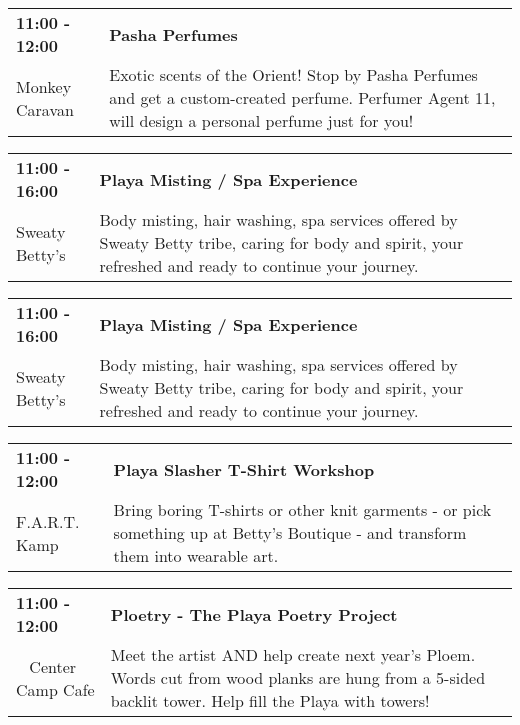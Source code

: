 \begin{tabular}{ p{1in} p{2.2in} }
    \textbf{11:00 - 12:00} & \textbf{Pasha Perfumes} \\
    Monkey Caravan \newline  & Exotic scents of the Orient! Stop by Pasha Perfumes and get a custom-created perfume.  Perfumer Agent 11, will design a personal perfume just for you! \\
    \hline 
\end{tabular}
    
\begin{tabular}{ p{1in} p{2.2in} }
    \textbf{11:00 - 16:00} & \textbf{Playa Misting / Spa Experience} \\
    Sweaty  Betty's \newline  & Body misting, hair washing, spa services offered by Sweaty Betty tribe, caring for body and spirit, your refreshed and ready to continue your journey. \\
    \hline 
\end{tabular}
    
\begin{tabular}{ p{1in} p{2.2in} }
    \textbf{11:00 - 16:00} & \textbf{Playa Misting / Spa Experience} \\
    Sweaty  Betty's \newline  & Body misting, hair washing, spa services offered by Sweaty Betty tribe, caring for body and spirit, your refreshed and ready to continue your journey. \\
    \hline 
\end{tabular}
    
\begin{tabular}{ p{1in} p{2.2in} }
    \textbf{11:00 - 12:00} & \textbf{Playa Slasher T-Shirt Workshop} \\
    F.A.R.T. Kamp \newline  & Bring boring T-shirts or other knit garments - or pick something up at Betty's Boutique - and transform them into wearable art. \\
    \hline 
\end{tabular}
    
\begin{tabular}{ p{1in} p{2.2in} }
    \textbf{11:00 - 12:00} & \textbf{Ploetry - The Playa Poetry Project} \\
    ~ \newline Center Camp Cafe & Meet the artist AND help create next year's Ploem. Words cut from wood planks are hung from a 5-sided backlit tower. Help fill the Playa with towers! \\
    \hline 
\end{tabular}
    
